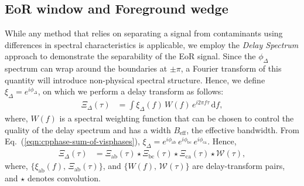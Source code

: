 \documentclass[
reprint,
superscriptaddress,
amsmath,
amssymb,
aps,
prd
]{revtex4-1}
\begin{document}
\subsection{EoR window and Foreground wedge}\label{sec:cp-FG-wedge}

While any method that relies on separating a signal from contaminants using differences in spectral characteristics is applicable, we employ the {\it Delay Spectrum} approach \cite{par12a,par12b} to demonstrate the separability of the EoR signal. Since the $\phi_\Delta$ spectrum can wrap around the boundaries at $\pm\pi$, a Fourier transform of this quantity will introduce non-physical spectral structure. Hence, we define $\xi_\Delta = e^{i\phi_\Delta}$, on which we perform a delay transform as follows:
\begin{align}\label{eqn:cpdspec}
  \Xi_\Delta(\tau) &= \int \xi_\Delta(f)\,W(f)\,e^{i2\pi f\tau}\,\mathrm{d}f,
\end{align}
where, $W(f)$ is a spectral weighting function that can be chosen to control the quality of the delay spectrum \citep{thy13,thy16} and has a width $B_\textrm{eff}$, the effective bandwidth. From Eq.~(\ref{eqn:cpphase-sum-of-visphases}), $\xi_\Delta = e^{i\phi_\textrm{ab}}\,e^{i\phi_\textrm{bc}}\,e^{i\phi_\textrm{ca}}$. Hence,
\begin{align}
  \Xi_\Delta(\tau) &= \Xi_\textrm{ab}(\tau) \star \Xi_\textrm{bc}(\tau) \star \Xi_\textrm{ca}(\tau) \star \mathcal{W}(\tau), \label{eqn:cpdspec-convolution}
\end{align}
where, $\{\xi_\textrm{ab}(f),\,\Xi_\textrm{ab}(\tau)\}$, and $\{W(f),\,\mathcal{W}(\tau)\}$ are delay-transform pairs, and $\star$ denotes convolution. 

\end{document}
